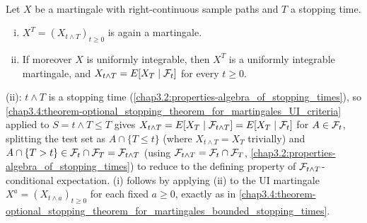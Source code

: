 \begin{corollary} \label{chap3.4:corollary-stopped_martingale_is_martingale}  \\
Let $X$ be a martingale with right-continuous sample paths and $T$ a stopping time.
\begin{enumerate}[(i)]
    \item $X^T=(X_{t\wedge T})_{t\ge0}$ is again a martingale.
    \item If moreover $X$ is uniformly integrable, then $X^T$ is a uniformly integrable martingale, and $X_{t\wedge T}=E[X_T\mid\mathcal{F}_t]$ for every $t\ge0$.
\end{enumerate}
\end{corollary}
\begin{proofidea}
(ii): $t\wedge T$ is a stopping time (\cref{chap3.2:properties-algebra_of_stopping_times}), so \cref{chap3.4:theorem-optional_stopping_theorem_for_martingales_UI_criteria} applied to $S=t\wedge T\le T$ gives $X_{t\wedge T}=E[X_T\mid\mathcal{F}_{t\wedge T}]=E[X_T\mid\mathcal{F}_t]$ for $A\in\mathcal{F}_t$, splitting the test set as $A\cap\{T\le t\}$ (where $X_{t\wedge T}=X_T$ trivially) and $A\cap\{T>t\}\in\mathcal{F}_t\cap\mathcal{F}_T=\mathcal{F}_{t\wedge T}$ (using $\mathcal{F}_{t\wedge T}=\mathcal{F}_t\cap\mathcal{F}_T$, \cref{chap3.2:properties-algebra_of_stopping_times}) to reduce to the defining property of $\mathcal{F}_{t\wedge T}$-conditional expectation. (i) follows by applying (ii) to the UI martingale $X^a=(X_{t\wedge a})_{t\ge0}$ for each fixed $a\ge0$, exactly as in \cref{chap3.4:theorem-optional_stopping_theorem_for_martingales_bounded_stopping_times}.
\end{proofidea}

